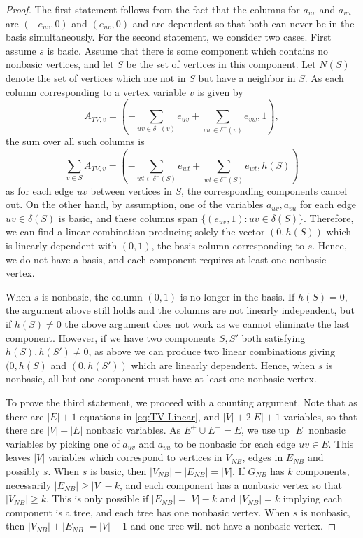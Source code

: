 \documentclass[10pt,a4paper]{amsart}
\begin{document}
\begin{proof}
    The first statement follows from the fact that the columns for $a_{uv}$ and $a_{vu}$ are $(-e_{uv}, 0)$ and $(e_{uv}, 0)$ and are dependent so that both can never be in the basis simultaneously.
    For the second statement, we consider two cases. First assume $s$ is basic. Assume that there is some component which contains no nonbasic vertices, and let $S$ be the set of vertices in this component. Let $N(S)$ denote the set of vertices which are not in $S$ but have a neighbor in $S$. As each column corresponding to a vertex variable $v$ is given by
    \[
        A_{TV,v} = (-\sum_{uv \in \delta^-(v)}e_{uv} + \sum_{vw\in \delta^+(v)}e_{vw}, 1),
    \]
    the sum over all such columns is
    \[
        \sum_{v\in S} A_{TV,v} = (-\sum_{wt \in \delta^-(S)}e_{wt} + \sum_{wt \in \delta^+(S)}e_{wt}, h(S))
    \]
    as for each edge $uv$ between vertices in $S$, the corresponding components cancel out. On the other hand, by assumption, one of the variables $a_{uv}, a_{vu}$ for each edge $uv \in \delta(S)$ is basic, and these columns span $\{(e_{uv},1): uv \in \delta(S)\}$. Therefore, we can find a linear combination producing solely the vector $(0, h(S))$ which is linearly dependent with $(0,1)$, the basis column corresponding to $s$. Hence, we do not have a basis, and each component requires at least one nonbasic vertex.

    When $s$ is nonbasic, the column $(0,1)$ is no longer in the basis. If $h(S) = 0$, the argument above still holds and the columns are not linearly independent, but if $h(S) \ne 0$ the above argument does not work as we cannot eliminate the last component. However, if we have two components $S, S'$ both satisfying $h(S), h(S')\ne 0 $, as above we can produce two linear combinations giving $(0, h(S)$ and $(0, h(S'))$ which are linearly dependent. Hence, when $s$ is nonbasic, all but one component must have at least one nonbasic vertex.

    To prove the third statement, we proceed with a counting argument. Note that as there are $|E| + 1$ equations in \eqref{eq:TV-Linear}, and $|V| + 2|E| + 1$ variables, so that there are $|V| + |E|$ nonbasic variables. As $E^+ \cup E^- = E$, we use up $|E|$ nonbasic variables by picking one of $a_{uv}$ and $a_{vu}$ to be nonbasic for each edge $uv \in E$. This leaves $|V|$ variables which correspond to vertices in $V_{NB}$, edges in $E_{NB}$ and possibly $s$. When $s$ is basic, then $|V_{NB}| + |E_{NB}| = |V|$. If $G_{NB}$ has $k$ components, necessarily  $|E_{NB}| \ge |V|-k$, and each component has a nonbasic vertex so that $|V_{NB}| \ge k.$ This is only possible if $|E_{NB}| = |V|-k$ and $|V_{NB}| = k$ implying each component is a tree, and each tree has one nonbasic vertex. When $s$ is nonbasic, then $|V_{NB}| + |E_{NB}| = |V|-1$ and one tree will not have a nonbasic vertex. 
\end{proof}
\end{document}
